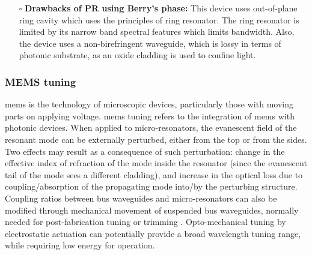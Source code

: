 \documentclass[../report.tex]{subfiles}
\begin{document}
\begin{itemize}[leftmargin=*]
		\item[$\square$] \textbf{Drawbacks of PR using Berry's phase:}
		This device uses out-of-plane ring cavity which uses the principles of ring resonator. The ring resonator is limited by its narrow band spectral features which limits bandwidth. Also, the device uses a non-birefringent waveguide, which is lossy in terms of photonic substrate, as an oxide cladding is used to confine light. 	
	\end{itemize}
	
\subsubsection{MEMS tuning}  \gls{mems} is the technology of microscopic devices, particularly those with moving parts on applying voltage. \gls{mems} tuning refers to the integration of \gls{mems} with photonic devices. When applied to micro-resonators, the evanescent field of the resonant mode can be externally perturbed, either from the top or from the sides. Two effects may result as a consequence of such perturbation: change in the effective index of refraction of the mode inside the resonator (since the evanescent tail of the mode sees a different cladding), and increase in the optical loss due to coupling/absorption of the propagating mode into/by the perturbing structure. Coupling ratios between bus waveguides and micro-resonators can also be modified through mechanical movement of suspended bus waveguides, normally needed for post-fabrication tuning or trimming \cite{elfadel_3d_2016}. Opto-mechanical tuning by electrostatic actuation can potentially provide a broad wavelength tuning range, while requiring low energy for operation.
\end{document}
